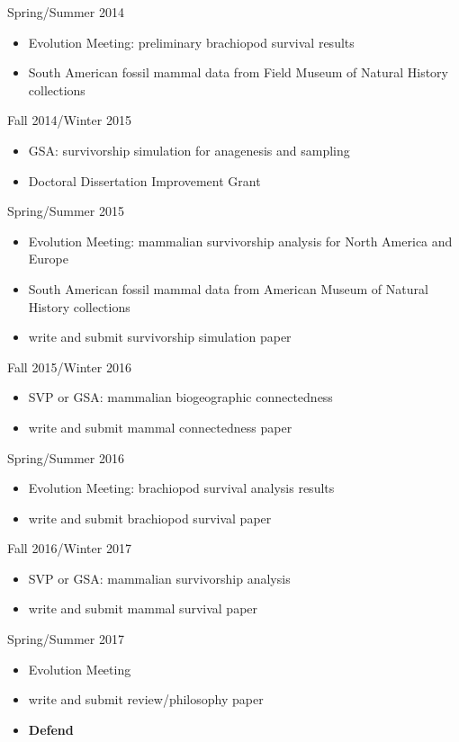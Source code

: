 \documentclass[12pt,letterpaper]{article}
\begin{document}
Spring/Summer 2014
\begin{itemize}
  \item Evolution Meeting: preliminary brachiopod survival results
  \item South American fossil mammal data from Field Museum of Natural History collections
\end{itemize}

Fall 2014/Winter 2015
\begin{itemize}
  \item GSA: survivorship simulation for anagenesis and sampling
  \item Doctoral Dissertation Improvement Grant
\end{itemize}

Spring/Summer 2015
\begin{itemize}
  \item Evolution Meeting: mammalian survivorship analysis for North America and Europe
  \item South American fossil mammal data from American Museum of Natural History collections
  \item write and submit survivorship simulation paper
\end{itemize}

Fall 2015/Winter 2016
\begin{itemize}
  \item SVP or GSA: mammalian biogeographic connectedness
  \item write and submit mammal connectedness paper
\end{itemize}

Spring/Summer 2016
\begin{itemize}
  \item Evolution Meeting: brachiopod survival analysis results
  \item write and submit brachiopod survival paper
\end{itemize}

Fall 2016/Winter 2017
\begin{itemize}
  \item SVP or GSA: mammalian survivorship analysis
  \item write and submit mammal survival paper
\end{itemize}

Spring/Summer 2017
\begin{itemize}
  \item Evolution Meeting
  \item write and submit review/philosophy paper
  \item \textbf{Defend}
\end{itemize}



\clearpage


\end{document}
